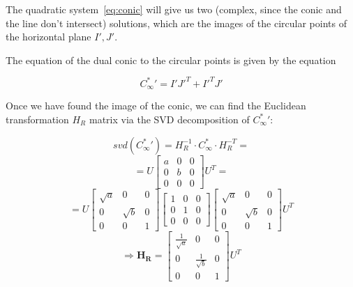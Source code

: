 \documentclass[a4paper, 11pt, oneside, openright, english]{article}
\begin{document}
The quadratic system~\ref{eq:conic} will give us two (complex, since the conic and the line don't intersect) solutions, which are the images of the circular points of the horizontal plane $I', J'$.

The equation of the dual conic to the circular points is given by the equation

\begin{equation}
    {C^{*}_\infty}' = I' {J'}^T + {I'}^T J'
\end{equation}

Once we have found the image of the conic, we can find the Euclidean transformation $H_R$ matrix via the SVD decomposition of ${C^{*}_\infty}'$:

\begin{equation*}
    svd({C^{*}_\infty}')
    = H_R^{-1} \cdot C^{*}_\infty \cdot H_R^{-T} =
\end{equation*}
\begin{equation*}
    = U
    \begin{bmatrix}
        a & 0 & 0 \\
        0 & b & 0 \\
        0 & 0 & 0
    \end{bmatrix}
    U^T =
\end{equation*}
\begin{equation*}
    = U
    \begin{bmatrix}
        \sqrt{a} & 0        & 0 \\
        0        & \sqrt{b} & 0 \\
        0        & 0        & 1
    \end{bmatrix}
    \begin{bmatrix}
        1 & 0 & 0 \\
        0 & 1 & 0 \\
        0 & 0 & 0
    \end{bmatrix}
    \begin{bmatrix}
        \sqrt{a} & 0        & 0 \\
        0        & \sqrt{b} & 0 \\
        0        & 0        & 1
    \end{bmatrix}
    U^T
\end{equation*}
\begin{equation}
    \Rightarrow \mathbf{H_R} = \begin{bmatrix}
        \frac{1}{\sqrt{a}} & 0                  & 0 \\
        0                  & \frac{1}{\sqrt{b}} & 0 \\
        0                  & 0                  & 1
    \end{bmatrix}
    U^T
\end{equation}
\end{document}
